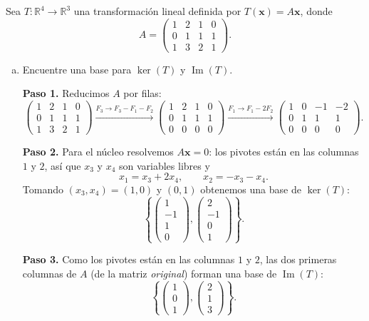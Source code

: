 \begin{example}\label{ex:tl_nucleo_imagen}
Sea $T: \mathbb{R}^4 \to \mathbb{R}^3$ una transformación lineal definida por $T(\mathbf{x}) = A\mathbf{x}$, donde
\[
A = \begin{pmatrix} 1 & 2 & 1 & 0 \\ 0 & 1 & 1 & 1 \\ 1 & 3 & 2 & 1 \end{pmatrix}.
\]

\begin{enumerate}[(a)]
\item Encuentre una base para $\ker(T)$ y $\operatorname{Im}(T)$.
\begin{myproof}
\textbf{Paso 1.} Reducimos $A$ por filas:
\[
\begin{pmatrix} 1 & 2 & 1 & 0 \\ 0 & 1 & 1 & 1 \\ 1 & 3 & 2 & 1 \end{pmatrix}
\xrightarrow{F_3 \to F_3 - F_1 - F_2}
\begin{pmatrix} 1 & 2 & 1 & 0 \\ 0 & 1 & 1 & 1 \\ 0 & 0 & 0 & 0 \end{pmatrix}
\xrightarrow{F_1 \to F_1 - 2F_2}
\begin{pmatrix} 1 & 0 & -1 & -2 \\ 0 & 1 & 1 & 1 \\ 0 & 0 & 0 & 0 \end{pmatrix}.
\]

\textbf{Paso 2.} Para el núcleo resolvemos $A\mathbf{x} = 0$: los pivotes están en las columnas $1$ y $2$, así que $x_3$ y $x_4$ son variables libres y
\[
x_1 = x_3 + 2x_4, \qquad x_2 = -x_3 - x_4.
\]
Tomando $(x_3, x_4) = (1,0)$ y $(0,1)$ obtenemos una base de $\ker(T)$:
\[
\left\{
\begin{pmatrix} 1 \\ -1 \\ 1 \\ 0 \end{pmatrix},
\begin{pmatrix} 2 \\ -1 \\ 0 \\ 1 \end{pmatrix}
\right\}.
\]

\textbf{Paso 3.} Como los pivotes están en las columnas $1$ y $2$, las dos primeras columnas de $A$ (de la matriz \emph{original}) forman una base de $\operatorname{Im}(T)$:
\[
\left\{
\begin{pmatrix} 1 \\ 0 \\ 1 \end{pmatrix},
\begin{pmatrix} 2 \\ 1 \\ 3 \end{pmatrix}
\right\}.
\]


\end{myproof}
\end{enumerate}
\end{example}
